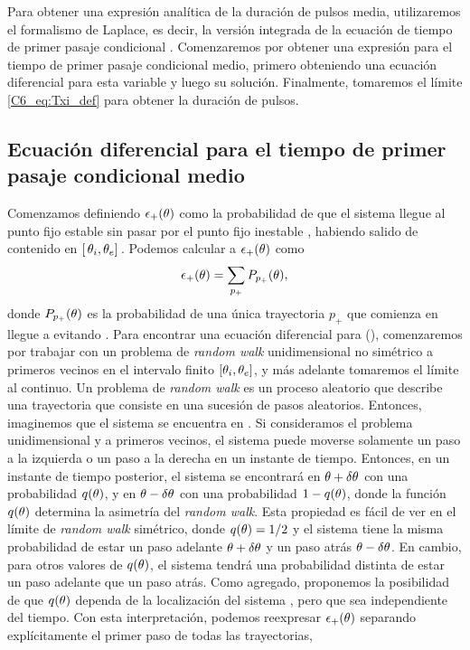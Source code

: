 \documentclass[./main.tex]{subfiles}
\begin{document}
Para obtener una expresión analítica de la duración de pulsos media, utilizaremos el formalismo de Laplace, es decir, la versión integrada de la ecuación de tiempo de primer pasaje condicional \cite{Redner2001}. Comenzaremos por obtener una expresión para el tiempo de primer pasaje condicional medio, primero obteniendo una ecuación diferencial para esta variable y luego su solución. Finalmente, tomaremos el límite \ref{C6_eq:Txi_def} para obtener la duración de pulsos.

\subsection{Ecuación diferencial para el tiempo de primer pasaje condicional medio}

Comenzamos definiendo $\epsilon_{+}(\theta)$ como la probabilidad de que el sistema llegue al punto fijo estable \xxe sin pasar por el punto fijo inestable \xxi, habiendo salido de \xx contenido en $[ \,\theta_i,\theta_e ]\,$. Podemos calcular a $\epsilon_{+}(\theta)$ como 
\begin{equation}
    \epsilon_{+}(\theta) = \sum_{p_{+}} P_{p_{+}}(\theta),
    \label{C6_eq:mFPT_eps_def}
\end{equation}
donde $P_{p_{+}}(\theta)$ es la probabilidad de una única trayectoria $p_{+}$ que comienza en \xx llegue a \xxe evitando \xxi. Para encontrar una ecuación diferencial para \epsplus(\xx), comenzaremos por trabajar con un problema de \textit{random walk} unidimensional no simétrico a primeros vecinos en el intervalo finito $[\theta_i,\theta_e ]$, y más adelante tomaremos el límite al continuo. Un problema de \textit{random walk} es un proceso aleatorio que describe una trayectoria que consiste en una sucesión de pasos aleatorios. Entonces, imaginemos que el sistema se encuentra en \xx. Si consideramos el problema unidimensional y a primeros vecinos, el sistema puede moverse solamente un paso a la izquierda o un paso a la derecha en un instante de tiempo. Entonces, en un instante de tiempo posterior, el sistema se encontrará en $\theta+\delta\theta$ con una probabilidad $q(\theta)$, y en $\theta-\delta\theta$ con una probabilidad $1-q(\theta)$, donde la función $q(\theta)$ determina la asimetría del \textit{random walk}. Esta propiedad es fácil de ver en el límite de \textit{random walk} simétrico, donde $q(\theta) = 1/2$ y el sistema tiene la misma probabilidad de estar un paso adelante $\theta+\delta\theta$ y un paso atrás $\theta-\delta\theta$. En cambio, para otros valores de $q(\theta)$, el sistema tendrá una probabilidad distinta de estar un paso adelante que un paso atrás. Como agregado, proponemos la posibilidad de que $q(\theta)$ dependa de la localización del sistema \xx, pero que sea independiente del tiempo. Con esta interpretación, podemos reexpresar $ \epsilon_{+}(\theta)$ separando explícitamente el primer paso de todas las trayectorias,
\end{document}
